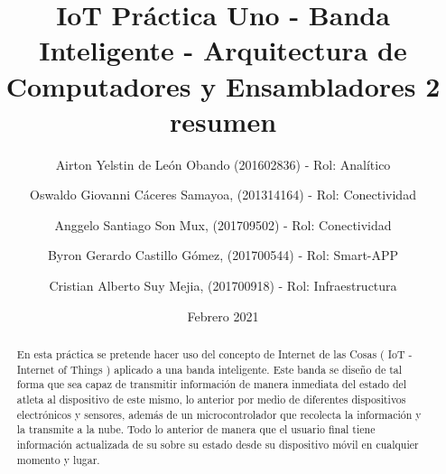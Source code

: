 \documentclass[osajnl,twocolumn,showpacs,superscriptaddress,10pt]{revtex4-1}
\begin{document}

\title{\Huge IoT Práctica Uno -  Banda Inteligente - Arquitectura de Computadores y Ensambladores 2 }

\author{\newline Airton Yelstin de León Obando (201602836) - Rol: Analítico}
%

\author{\newline Oswaldo Giovanni Cáceres Samayoa, (201314164) - Rol: Conectividad}%
%
\author{\newline Anggelo Santiago Son Mux, (201709502) - Rol: Conectividad}%
%
\author{\newline Byron Gerardo Castillo Gómez, (201700544) - Rol: Smart-APP}%
%
\author{\newline Cristian Alberto Suy Mejia, (201700918) - Rol: Infraestructura}%
%
\date{Febrero 2021}



\begin{abstract}
\title {resumen}
En esta pr\'actica se pretende hacer uso del concepto de Internet de las Cosas ( IoT - Internet of Things ) aplicado a una banda inteligente. Este banda se diseño de tal forma que sea capaz de transmitir informaci\'on de manera inmediata del estado del atleta al dispositivo de este mismo, lo anterior por medio de diferentes dispositivos electrónicos y sensores, adem\'as de un microcontrolador que recolecta la informaci\'on y la transmite a la nube. Todo lo anterior de manera que el usuario final tiene informaci\'on actualizada de su sobre su estado desde su dispositivo m\'ovil en cualquier momento y lugar.
\end{abstract}
\maketitle{}
\end{document}
